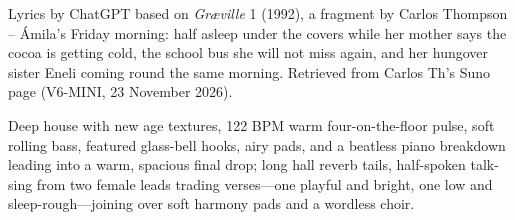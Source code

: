 %


\begin{notes}
Lyrics by ChatGPT based on \emph{Gr\ae ville} 1 (1992), a fragment by Carlos Thompson -- Ámila's Friday morning: half asleep under the covers while her mother says the cocoa is getting cold, the school bus she will not miss again, and her hungover sister Eneli coming round the same morning. Retrieved from Carlos Th's Suno page (V6-MINI, 23 November 2026).
\end{notes}
\begin{style}
Deep house with new age textures, 122 BPM warm four-on-the-floor pulse, soft rolling bass, featured glass-bell hooks, airy pads, and a beatless piano breakdown leading into a warm, spacious final drop; long hall reverb tails, half-spoken talk-sing from two female leads trading verses—one playful and bright, one low and sleep-rough—joining over soft harmony pads and a wordless choir.
\end{style}
